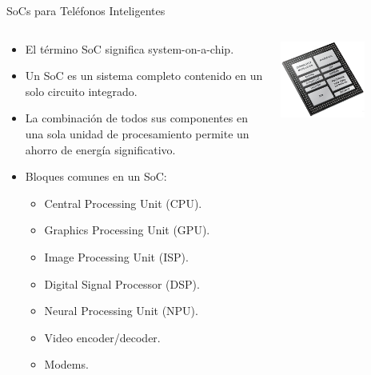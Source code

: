 \begin{frame}{SoCs para Teléfonos Inteligentes}
\begin{columns}
\begin{column}{0.60\textwidth}  
\begin{itemize}
\item El término SoC significa system-on-a-chip.
\item Un SoC es un sistema completo contenido en un solo circuito integrado.
\item La combinación de todos sus componentes en una sola unidad de procesamiento permite un ahorro de energía significativo. 
\item Bloques comunes en un SoC:
\begin{itemize}
\item Central Processing Unit (CPU).
\item Graphics Processing Unit (GPU).
\item Image Processing Unit (ISP).
\item Digital Signal Processor (DSP).
\item Neural Processing Unit (NPU).
\item Video encoder/decoder.
\item Modems.
\end{itemize}
\end{itemize}
\end{column}
\begin{column}{0.40\textwidth}  
    \begin{center}
\includegraphics[width=0.65\textwidth]{Figs/qualcomm_snapdragon410_block}\\

\end{center}
\end{column}
\end{columns}
\end{frame}
